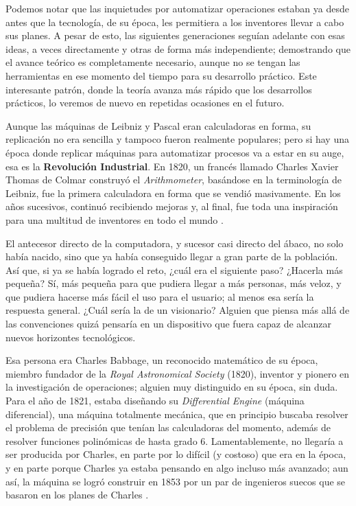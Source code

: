 \documentclass[letterpaper,12pt,oneside]{book}
\begin{document}
		Podemos notar que las inquietudes por automatizar operaciones estaban
		ya desde antes que la tecnología, de su época, les permitiera a los inventores llevar a cabo sus planes. A pesar de esto, las siguientes
		generaciones seguían adelante con esas ideas, a veces directamente y otras de forma más independiente; demostrando que el avance
		teórico es completamente necesario, aunque no se tengan las herramientas en ese momento del tiempo para su desarrollo práctico. Este interesante patrón, donde la teoría avanza más rápido que los desarrollos prácticos, lo veremos de nuevo en 	
		repetidas ocasiones en el futuro.
		
		Aunque las máquinas de Leibniz y Pascal eran calculadoras en forma, su replicación no era sencilla y tampoco fueron realmente populares; pero
		si hay una época donde replicar máquinas para automatizar procesos va a estar en su auge, esa es la \textbf{Revolución Industrial}. En
		1820, un francés llamado Charles Xavier Thomas de Colmar construyó el \textit{Arithmometer}, basándose en la terminología de Leibniz, fue la primera
		calculadora en forma que se vendió masivamente. En los años sucesivos, continuó recibiendo mejoras y, al final, fue toda una inspiración para una multitud de inventores 
		en todo el mundo \cite[p. 127]{ifrah_universal_2001}.
		
		El antecesor directo de la computadora, y sucesor casi directo del ábaco, no solo había nacido, sino que ya había conseguido llegar a gran parte de
		la población. Así que, si ya se había logrado el reto, ¿cuál era el siguiente paso? ¿Hacerla más pequeña? Sí, más pequeña para que pudiera llegar a más personas,
		más veloz, y que pudiera hacerse más fácil el uso para el usuario; al menos esa sería la respuesta general. ¿Cuál sería la de un visionario? Alguien
		que piensa más allá de las convenciones quizá pensaría en un dispositivo que fuera capaz de alcanzar nuevos horizontes tecnológicos. 
  
        Esa persona era Charles 
		Babbage,
		un reconocido matemático de su época, miembro fundador de la \textit{Royal Astronomical Society} (1820), inventor y  pionero en la investigación
		de operaciones; alguien muy distinguido en su época, sin duda. Para el año de 1821, estaba diseñando su \textit{Differential Engine} (máquina diferencial), una máquina totalmente mecánica, que
		en principio buscaba resolver el problema de precisión que tenían las calculadoras del momento, además de resolver funciones polinómicas de hasta
		grado 6. Lamentablemente, no llegaría a ser producida por Charles, en parte por lo difícil (y costoso) que era en la época, y en parte porque Charles ya estaba pensando 
		en algo incluso más avanzado; aun así, la máquina se logró construir en 1853 por un par de ingenieros suecos que se basaron en los planes de Charles
		\cite[p.201]{oregan_brief_2012}.
		
\end{document}
